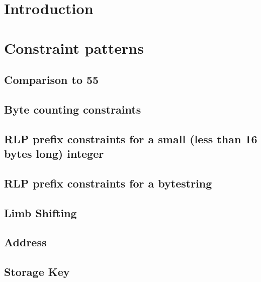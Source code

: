 \section{Introduction}

\section{Constraint patterns}
\subsection{Comparison to 55}                       
\subsection{Byte counting constraints}                         
\subsection{RLP prefix constraints for a small (less than 16 bytes long) integer}              
\subsection{RLP prefix constraints for a bytestring}              
\subsection{Limb Shifting} 

\subsection{Address} 
\subsection{Storage Key} 
